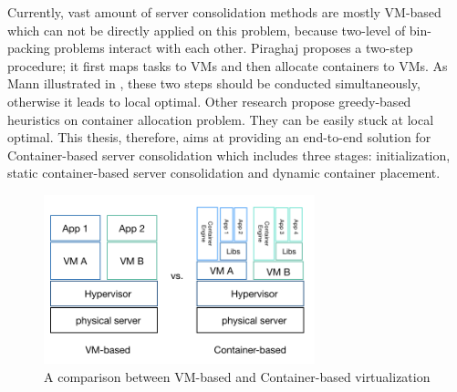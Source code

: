 Currently, vast amount of server consolidation methods are mostly VM-based which can not be directly applied on this problem, because two-level of bin-packing problems interact with each other. Piraghaj \cite{Piraghaj:2016bw} proposes a two-step procedure; it first maps tasks to VMs and then allocate containers to VMs. As Mann illustrated in \cite{Mann:2016hx},  these two steps should be conducted simultaneously, otherwise it leads to local optimal. Other research \cite{Dong:2014iz, Hindman:2011ux, Anselmi:2008ik} propose greedy-based heuristics on container allocation problem. They can be easily stuck at local optimal. 
This thesis, therefore, aims at providing an end-to-end solution for Container-based server consolidation which includes three stages: initialization, static container-based server consolidation and dynamic container placement.

\begin{figure}
	\centering
	\includegraphics[width=0.7\textwidth]{pics/comparison.png}
	\caption{A comparison between VM-based and Container-based virtualization}
	\label{fig:comparison}
\end{figure}


